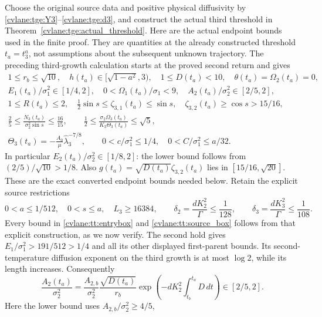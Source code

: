 Choose the original source data and positive physical diffusivity by
\eqref{cvlane:tge:Y3}--\eqref{cvlane:tge:d3}, and construct the actual third threshold
in Theorem~\ref{cvlane:tge:actual_threshold}.
Here are the actual endpoint bounds used in the finite proof. They are
quantities at the already constructed threshold $t_a=t_3^a$, not
assumptions about the subsequent unknown trajectory. The preceding
third-growth calculation starts at the proved second return and gives
\begin{equation}\label{cvlane:tt:entrybox}
\begin{gathered}
 1\leq r_b\leq\sqrt{10},\quad
 h(t_a)\in[\sqrt{1-a^2},3),\quad 1\leq D(t_a)<10,\quad
 \theta(t_a)=\Omega_2(t_a)=0,\\
 E_1(t_a)/\sigma_1^2\in[1/4,2],\quad
 0<\Omega_1(t_a)/\sigma_1<9,\quad
 A_2(t_a)/\sigma_2^2\in[2/5,2],\\
 1\leq R(t_a)\leq2,\quad
 \tfrac12\sin s\leq\zeta_{3,1}(t_a)\leq\sin s,\quad
 \zeta_{3,2}(t_a)\geq\cos s>15/16,\\
 \frac25\leq\frac{N_3(t_a)}{\sigma_2^2\sin s}\leq\frac{16}{15},
 \qquad \frac12\leq
 \frac{\sigma_2\Omega_3(t_a)}{K_3\Theta_3(t_a)}\leq\sqrt5,\\
 \Theta_3(t_a)=-\frac{A_0}{\mu}\widehat\lambda_3^{-7/8},\qquad
 0<c/\sigma_1^2\leq1/4,\quad
 0<C/\sigma_1^2\leq a/32.
\end{gathered}
\end{equation}
In particular $E_2(t_a)/\sigma_2^2\in[1/8,2]$:
the lower bound follows from $(2/5)/\sqrt{10}>1/8$.
Also $g(t_a)=\sqrt{D(t_a)}\zeta_{3,2}(t_a)$ lies in
$[15/16,\sqrt{20}]$. These are the exact converted endpoint
bounds needed below. Retain the explicit source restrictions
\begin{equation}\label{cvlane:tt:source_box}
 0<a\leq1/512,\quad 0<s\leq a,\quad L_3\geq16384,
 \qquad \delta_2=\frac{dK_2^2}{\Gamma}\leq\frac1{128},
 \qquad \delta_3=\frac{dK_3^2}{\Gamma}\leq\frac1{108}.
\end{equation}
Every bound in \eqref{cvlane:tt:entrybox} and \eqref{cvlane:tt:source_box} follows
from that explicit construction, as we now verify. The second hold
gives $E_1/\sigma_1^2>191/512>1/4$ and all its other displayed
first-parent bounds. Its second-temperature diffusion exponent on
the third growth is at most $\log2$, while its length increases.
Consequently
\[
 \frac{A_2(t_a)}{\sigma_2^2}
 =\frac{A_{2,b}}{\sigma_2^2}
    \frac{\sqrt{D(t_a)}}{r_b}
    \exp\!\left(-dK_2^2\int_{t_b}^{t_a}D\,dt\right)
 \in[2/5,2].
\]
Here the lower bound uses $A_{2,b}/\sigma_2^2\geq4/5$,
